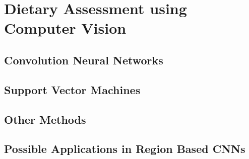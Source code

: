 \section{Dietary Assessment using Computer Vision}
\subsection*{Convolution Neural Networks}


\subsection*{Support Vector Machines}


\subsection*{Other Methods}


\subsection*{Possible Applications in Region Based CNNs}








